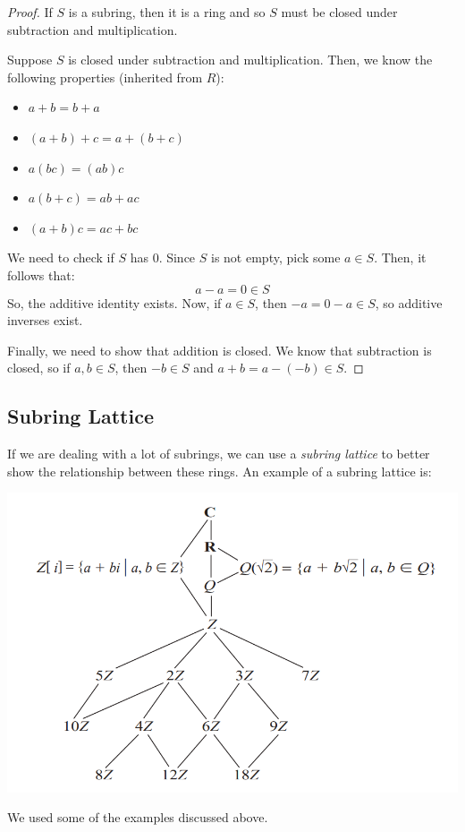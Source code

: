 \documentclass[letterpaper]{article}
\begin{document}
\begin{mdframed}[]
    \begin{proof}
        If $S$ is a subring, then it is a ring and so $S$ must be closed under subtraction and multiplication. 

        \bigskip 

        Suppose $S$ is closed under subtraction and multiplication. Then, we know the following properties (inherited from $R$): 
        \begin{itemize}
            \item $a + b = b + a$
            \item $(a + b) + c = a + (b + c)$
            \item $a(bc) = (ab)c$
            \item $a(b + c) = ab + ac$
            \item $(a + b)c = ac + bc$
        \end{itemize}
        We need to check if $S$ has 0. Since $S$ is not empty, pick some $a \in S$. Then, it follows that: 
        \[a - a = 0 \in S\]
        So, the additive identity exists. Now, if $a \in S$, then $-a = 0 - a \in S$, so additive inverses exist. 

        \bigskip 

        Finally, we need to show that addition is closed. We know that subtraction is closed, so if $a, b \in S$, then $-b \in S$ and $a + b = a - (-b) \in S$. 
    \end{proof}
\end{mdframed}

\subsection{Subring Lattice}
If we are dealing with a lot of subrings, we can use a \emph{subring lattice} to better show the relationship between these rings. An example of a subring lattice is: 
\begin{center}
    \includegraphics[scale=0.5]{../assets/lattice.png}
\end{center}
We used some of the examples discussed above.
\end{document}
